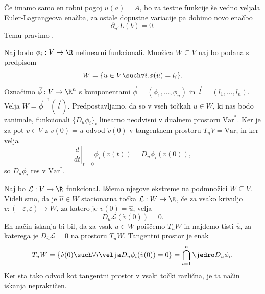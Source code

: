 
Če imamo samo en robni pogoj $u(a) = A$, bo za testne funkcije še vedno veljala
Euler-Lagrangeova enačba, za ostale dopustne variacije pa dobimo novo enačbo
\[
  \partial_{u'} L (b) = 0.
\]
Temu pravimo .


Naj bodo $\phi_i : V \to \R$ nelinearni funkcionali.
Množica $W \subseteq V$ naj bo podana s predpisom
\[
  W = \{u \in V \such \forall i . \phi(u) = l_i\}.
\]
Označimo $\vec{\phi}:V \to \R^n$ s komponentami $\vec{\phi} = (\phi_1, \ldots,
\phi_n)$ in $\vec{l} = (l_1, \ldots, l_n)$.
Velja $W = \vec{\phi}^{-1}(\vec{l})$.
Predpostavljamo, da so v vseh točkah $u \in W$, ki nas bodo zanimale, funkcionali
$\{D_u \phi_i\}_i$ linearno neodvisni v dualnem prostoru $\text{Var}^*$.
Ker je za pot $v \in V$ z $v(0) = u$ odvod $\dot{v}(0)$ v tangentnem prostoru
$T_u V = \text{Var}$, in ker velja
\[
  \left. \frac{d}{dt} \right|_{t=0} \phi_i(v(t)) = D_u \phi_i (\dot{v}(0)),
\]
so $D_u \phi_i$ res v $\text{Var}^*$.

Naj bo $\mathcal{L}: V \to \R$ funkcional.
Iščemo njegove ekstreme na podmnožici $W \subseteq V$.
Videli smo, da je $\hat{u} \in W$ stacionarna točka $\mathcal{L}: W \to \R$, če
za vsako krivuljo $v: (-\varepsilon, \varepsilon) \to W$, za katero je
$v(0) = \hat{u}$, velja
\[
  D_u \mathcal{L}(\dot{v}(0)) = 0.
\]
En način iskanja bi bil, da za vsak $u \in W$ poiščemo $T_u W$ in najdemo tisti
$\hat{u}$, za katerega je $D_{\hat{u}} \mathcal{L} = 0$ na prostoru $T_{\hat{u}}
W$.
Tangentni prostor je enak
\[
  T_u W = \{ \dot{v}(0) \such \forall i \velja D_u \phi_i(\dot{v}(0)) = 0\}
  = \bigcap_{i=1}^n \jedro D_u \phi_i.
\]
Ker sta tako odvod kot tangentni prostor v vsaki točki različna, je ta način
iskanja nepraktičen.


